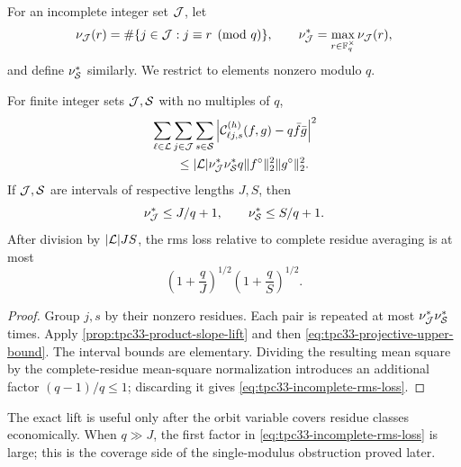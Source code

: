 For an incomplete integer set \(\mathcal J\), let
\begin{equation}
 \nu_{\mathcal J}(r)=\#\{j\in\mathcal J:j\equiv r\pmod q\},
 \qquad
 \nu_{\mathcal J}^*=\max_{r\in\mathbb F_q^\times}\nu_{\mathcal J}(r),
 \label{eq:tpc33-residue-multiplicity}
\end{equation}
and define \(\nu_{\mathcal S}^*\) similarly.  We restrict to elements nonzero
modulo \(q\).

\begin{corollary}
\label{cor:tpc33-incomplete-product-slope}
For finite integer sets \(\mathcal J,\mathcal S\) with no multiples of \(q\),
\begin{align}
 &\sum_{\ell\in\mathcal L}\sum_{j\in\mathcal J}\sum_{s\in\mathcal S}
 \left|\mathcal C_{\ell j,s}^{(h)}(f,g)-q\bar f\bar g\right|^2
 \notag\\
 &\qquad\le
 |\mathcal L|\nu_{\mathcal J}^*\nu_{\mathcal S}^*
 q\|f^\circ\|_2^2\|g^\circ\|_2^2.
 \label{eq:tpc33-incomplete-product-slope-energy}
\end{align}
If \(\mathcal J,\mathcal S\) are intervals of respective lengths \(J,S\), then
\begin{equation}
 \nu_{\mathcal J}^*\le J/q+1,
 \qquad
 \nu_{\mathcal S}^*\le S/q+1.
 \label{eq:tpc33-interval-residue-multiplicity}
\end{equation}
After division by \(|\mathcal L|JS\), the rms loss relative to complete residue
averaging is at most
\begin{equation}
 \boxed{
 \left(1+\frac qJ\right)^{1/2}
 \left(1+\frac qS\right)^{1/2}.}
 \label{eq:tpc33-incomplete-rms-loss}
\end{equation}
\end{corollary}

\begin{proof}
Group \(j,s\) by their nonzero residues.  Each pair is repeated at most
\(\nu_{\mathcal J}^*\nu_{\mathcal S}^*\) times.  Apply
\cref{prop:tpc33-product-slope-lift} and then
\eqref{eq:tpc33-projective-upper-bound}.  The interval bounds are
elementary.  Dividing the resulting mean square by the complete-residue
mean-square normalization introduces an additional factor
\((q-1)/q\le1\); discarding it gives
\eqref{eq:tpc33-incomplete-rms-loss}.
\end{proof}

The exact lift is useful only after the orbit variable covers residue
classes economically.  When \(q\gg J\), the first factor in
\eqref{eq:tpc33-incomplete-rms-loss} is large; this is the coverage side of
the single-modulus obstruction proved later.
